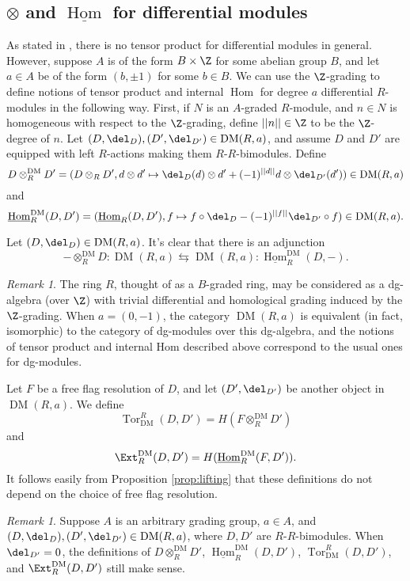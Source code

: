 \documentclass[12pt]{amsart}
\theoremstyle{definition}
\theoremstyle{remark}
\newtheorem{rem}[lemma]{Remark}
\newcommand{\Tor}{\operatorname{Tor}}
\newcommand{\Hom}{\operatorname{Hom}} %
\def\DM{\operatorname{DM}}
\begin{document}
\subsection{$\otimes$ and $\underline{\Hom}$ for differential modules}
As stated in \cite{ABI}, there is no tensor product for differential modules in general. However, suppose $A$ is of the form $B \times \Z$ for some abelian group $B$, and let $a \in A$ be of the form $(b, \pm 1)$ for some $b \in B$. We can use the $\Z$-grading to define notions of tensor product and internal $\Hom$ for degree $a$ differential $R$-modules in the following way. First, if $N$ is an $A$-graded $R$-module, and $n \in N$ is homogeneous with respect to the $\Z$-grading, define $||n|| \in \Z$ to be the $\Z$-degree of $n$. Let $(D, \del_D), (D', \del_{D'}) \in \DM(R, a)$, and assume $D$ and $D'$ are equipped with left $R$-actions making them $R$-$R$-bimodules. Define
$$
D \otimes_R^{\DM} D' = (D \otimes_R D', d \otimes d' \mapsto \del_D(d) \otimes d' + (-1)^{||d||}d \otimes \del_{D'}(d')) \in \DM(R, a)
$$
and 
$$
\underline{\Hom}_R^{\DM}(D, D') = (\underline{\Hom}_R(D, D'), f \mapsto f \circ \del_D - (-1)^{||f||} \del_{D'} \circ f) \in \DM(R, a).
$$

Let $(D, \del_D) \in \DM(R,a)$. It's clear that there is an adjunction
$$
- \otimes_R^{\DM} D : \DM(R,a) \leftrightarrows \DM(R,a) : \underline{\Hom}_R^{\DM}(D, -).
$$

\begin{rem}
The ring $R$, thought of as a $B$-graded ring, may be considered as a dg-algebra (over $\Z$) with trivial differential and homological grading induced by the $\Z$-grading. When $a = (0, -1)$, the category $\DM(R, a)$ is equivalent (in fact, isomorphic) to the category of dg-modules over this dg-algebra, and the notions of tensor product and internal Hom described above correspond to the usual ones for dg-modules.
\end{rem}

Let $F$ be a free flag resolution of $D$, and let $(D', \del_{D'})$ be another object in $\DM(R, a)$. We define
$$
\Tor^R_{\DM}(D, D') = H(F \otimes^{\DM}_R D')
$$
and
$$
\Ext_R^{\DM}(D, D') = H(\underline{\Hom}^{\DM}_R(F, D')).
$$
It follows easily from Proposition \ref{prop:lifting} that these definitions do not depend on the choice of free flag resolution. 



\begin{rem}
Suppose $A$ is an arbitrary grading group, $a \in A$, and $(D, \del_D), (D', \del_{D'}) \in \DM(R, a)$, where $D, D'$ are $R$-$R$-bimodules. When $\del_{D'} = 0$, the definitions of $D \otimes^{\DM}_R D'$, $\underline{\Hom}_R^{\DM}( D , D')$, $\Tor^R_{\DM}(D, D')$, and $\Ext_R^{\DM}(D, D')$ still make sense.
\end{rem}
\end{document}
